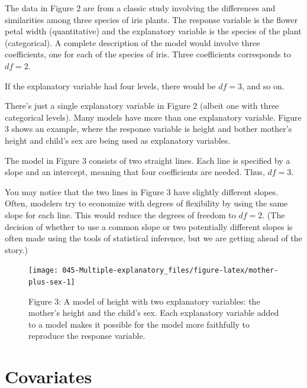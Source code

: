 \documentclass[]{tufte-book}
\begin{document}
The data in Figure 2 are from a classic study involving the differences and similarities among three species of iris plants. The response variable is the flower petal width (quantitative) and the explanatory variable is the species of the plant (categorical). A complete description of the model would involve three coefficients, one for each of the species of iris. Three coefficients corresponds to \(df = 2\).

If the explanatory variable had four levels, there would be \(df=3\), and so on.

There's just a single explanatory variable in Figure 2 (albeit one with three categorical levels). Many models have more than one explanatory variable. Figure 3 shows an example, where the response variable is height and bother mother's height and child's sex are being used as explanatory variables.

The model in Figure 3 consists of two straight lines. Each line is specified by a slope and an intercept, meaning that four coefficients are needed. Thus, \(df=3\).

You may notice that the two lines in Figure 3 have slightly different slopes. Often, modelers try to economize with degrees of flexibility by using the same slope for each line. This would reduce the degrees of freedom to \(df = 2\). (The decision of whether to use a common slope or two potentially different slopes is often made using the tools of statistical inference, but we are getting ahead of the story.)

\begin{figure}\texttt{[image: 045-Multiple-explanatory\_files/figure-latex/mother-plus-sex-1]} \caption[Figure 3: A model of height with two explanatory variables: the mother's height and the child's sex. Each explanatory variable added to a model makes it possible for the model more faithfully to reproduce the response variable.]{Figure 3: A model of height with two explanatory variables: the mother's height and the child's sex. Each explanatory variable added to a model makes it possible for the model more faithfully to reproduce the response variable.}\label{fig:mother-plus-sex}
\end{figure}



\hypertarget{covariates}{%
\section{Covariates}\label{covariates}}
\end{document}

